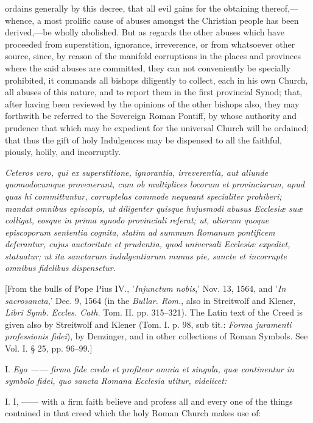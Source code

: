 ordains generally by this decree, that all evil gains for the obtaining thereof,—whence, a most prolific cause of abuses amongst the Christian people has been derived,—be wholly abolished. But as regards the other abuses which have proceeded from superstition, ignorance, irreverence, or from whatsoever other source, since, by reason of the manifold corruptions in the places and provinces where the said abuses are committed, they can not conveniently be specially prohibited, it commands all bishops diligently to collect, each in his own Church, all abuses of this nature, and to report them in the first provincial Synod; that, after having been reviewed by the opinions of the other bishops also, they may forthwith be referred to the Sovereign Roman Pontiff, by whose authority and prudence that which may be expedient for the universal Church will be ordained; that thus the gift of holy Indulgences may be dispensed to all the faithful, piously, holily, and incorruptly.

\emph{Ceteros vero, qui ex superstitione, ignorantia, irreverentia, aut aliunde quomodocumque provenerunt, cum ob multiplices locorum et provinciarum, apud quas hi committuntur, corruptelas commode nequeant specialiter prohiberi; mandat omnibus episcopis, ut diligenter quisque hujusmodi abusus Ecclesiæ suæ colligat, eosque in prima synodo provinciali referat; ut, aliorum quoque episcoporum sententia cognita, statim ad summum Romanum pontificem deferantur, cujus auctoritate et prudentia, quod universali Ecclesiæ expediet, statuatur; ut ita sanctarum indulgentiarum munus pie, sancte et incorrupte omnibus fidelibus dispensetur.}


[From the bulls of Pope Pius IV., '\emph{Injunctum nobis},' Nov. 13, 1564, and '\emph{In sacrosancta},' Dec. 9, 1564 (in the \emph{Bullar. Rom.}, also in Streitwolf and Klener, \emph{Libri Symb. Eccles. Cath.} Tom. II. pp. 315–321). The Latin text of the Creed is given also by Streitwolf and Klener (Tom. I. p. 98, sub tit.: \emph{Forma juramenti professionis fidei}), by Denzinger, and in other collections of Roman Symbols. See Vol. I. § 25, pp. 96–99.]

I. \emph{Ego —— firma fide credo et profiteor omnia et singula, quæ continentur in symbolo fidei, quo sancta Romana Ecclesia utitur, videlicet:}

I. I, —— with a firm faith believe and profess all and every one of the things contained in that creed which the holy Roman Church makes use of:

